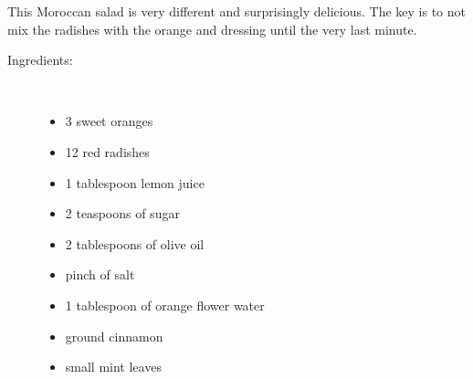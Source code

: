 \documentclass[11pt,letterpaper]{article}
\begin{document}


This Moroccan salad is very different and surprisingly delicious. The key is to not mix the radishes with the orange and dressing until the very last minute.

\begin{description}

\item[Ingredients:]\ \\
	\begin{itemize}
	\item 3 sweet oranges 
	\item 12 red radishes
	\item 1 tablespoon lemon juice
	\item 2 teaspoons of sugar
	\item 2 tablespoons of olive oil
	\item pinch of salt
	\item 1 tablespoon of orange flower water
	\item ground cinnamon
	\item small mint leaves
	\end{itemize}


\end{description}
\end{document}
